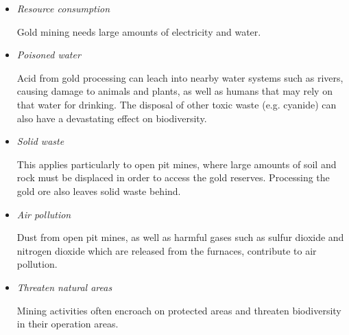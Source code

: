 \begin{itemize}
\item{\textit{Resource consumption}

Gold mining needs large amounts of electricity and water.
}

\item{\textit{Poisoned water}

Acid from gold processing can leach into nearby water systems such as rivers, causing damage to animals and plants, as well as humans that may rely on that water for drinking. The disposal of other toxic waste (e.g. cyanide) can also have a devastating effect on biodiversity.
}

\item{\textit{Solid waste}

This applies particularly to open pit mines, where large amounts of soil and rock must be displaced in order to access the gold reserves. Processing the gold ore also leaves solid waste behind.
}

\item{\textit{Air pollution}

Dust from open pit mines, as well as harmful gases such as sulfur dioxide and nitrogen dioxide which are released from the furnaces, contribute to air pollution.
}

\item{\textit{Threaten natural areas}

Mining activities often encroach on protected areas and threaten biodiversity in their operation areas.
}
\end{itemize}

